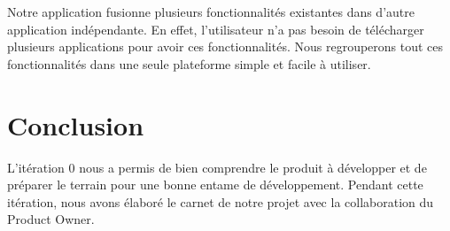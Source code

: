 Notre application fusionne plusieurs fonctionnalités existantes dans d'autre application
indépendante. En effet, l'utilisateur n'a pas besoin de télécharger plusieurs applications
pour avoir ces fonctionnalités.
Nous regrouperons tout ces fonctionnalités dans une seule plateforme simple et facile à
utiliser.

\section*{Conclusion}

L'itération 0 nous a permis de bien comprendre le produit à développer et de
préparer le terrain pour une bonne entame de développement. Pendant cette
itération, nous avons élaboré le carnet de notre projet avec la collaboration
du Product Owner.
